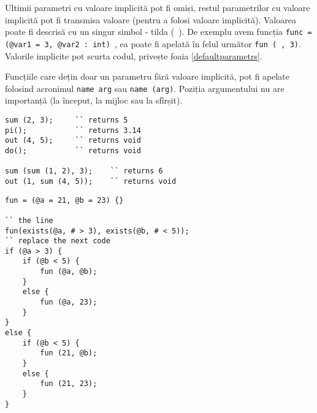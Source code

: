 Ultimii parametri cu valoare implicită pot fi omiși, restul parametrilor cu valoare implicită pot fi transmisa valoare \void{} (pentru a folosi valoare implicită). Valoarea \void{} poate fi descrisă cu un singur simbol - tilda (\texttt{~}). De exemplu avem funcția \texttt{func = (@var1 = 3, @var2 : int) {}}, ea poate fi apelată în felul următor \texttt{fun (~, 3)}. Valorile implicite pot scurta codul, privește foaia \ref{defaultparametrs}.

Funcțiile care dețin doar un parametru fără valoare implicită, pot fi apelate folosind acronimul \texttt{name arg} sau \texttt{name (arg)}. Poziția argumentului nu are importanță (la început, la mijloc sau la sfîrșit).

\begin{sourcecode}
\label{callfunc}
\begin{verbatim}
sum (2, 3); 	`` returns 5
pi();			`` returns 3.14
out (4, 5); 	`` returns void
do();			`` returns void

sum (sum (1, 2), 3);	`` returns 6
out (1, sum (4, 5));	`` returns void
\end{verbatim}
\end{sourcecode}

\newpage
\begin{sourcecode}
\label{defaultparametrs}
\begin{verbatim}
fun = (@a = 21, @b = 23) {}

`` the line 
fun(exists(@a, # > 3), exists(@b, # < 5));
`` replace the next code
if (@a > 3) {
	if (@b < 5) {
		fun (@a, @b);
	}
	else {
		fun (@a, 23);
	}
}
else {
	if (@b < 5) {
		fun (21, @b);
	}
	else {
		fun (21, 23);
	}
}
\end{verbatim}
\end{sourcecode}

